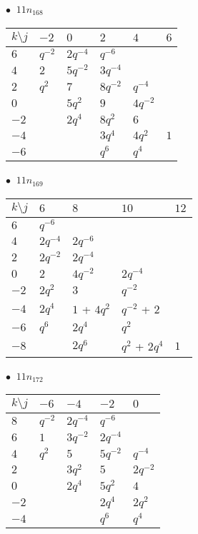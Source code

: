 \begin{minipage}{\linewidth}
$\bullet\ $ $11n_{168}$ \vspace{0.5em} \\
\begin{tabular}{l|lllll}
$k \setminus j$ & $-2$ & $0$ & $2$ & $4$ & $6$ \\
\hline
$6$ & $q^{-2}$ & $2q^{-4}$ & $q^{-6}$ &  &  \\
$4$ & $2$ & $5q^{-2}$ & $3q^{-4}$ &  &  \\
$2$ & $q^{2}$ & $7$ & $8q^{-2}$ & $q^{-4}$ &  \\
$0$ &  & $5q^{2}$ & $9$ & $4q^{-2}$ &  \\
$-2$ &  & $2q^{4}$ & $8q^{2}$ & $6$ &  \\
$-4$ &  &  & $3q^{4}$ & $4q^{2}$ & $1$ \\
$-6$ &  &  & $q^{6}$ & $q^{4}$ &  \\
\end{tabular}
\vspace{2em}
\end{minipage}
%
\begin{minipage}{\linewidth}
$\bullet\ $ $11n_{169}$ \vspace{0.5em} \\
\begin{tabular}{l|llll}
$k \setminus j$ & $6$ & $8$ & $10$ & $12$ \\
\hline
$6$ & $q^{-6}$ &  &  &  \\
$4$ & $2q^{-4}$ & $2q^{-6}$ &  &  \\
$2$ & $2q^{-2}$ & $2q^{-4}$ &  &  \\
$0$ & $2$ & $4q^{-2}$ & $2q^{-4}$ &  \\
$-2$ & $2q^{2}$ & $3$ & $q^{-2}$ &  \\
$-4$ & $2q^{4}$ & $1$ + $4q^{2}$ & $q^{-2}$ + $2$ &  \\
$-6$ & $q^{6}$ & $2q^{4}$ & $q^{2}$ &  \\
$-8$ &  & $2q^{6}$ & $q^{2}$ + $2q^{4}$ & $1$ \\
\end{tabular}
\vspace{2em}
\end{minipage}
%
\begin{minipage}{\linewidth}
$\bullet\ $ $11n_{172}$ \vspace{0.5em} \\
\begin{tabular}{l|llll}
$k \setminus j$ & $-6$ & $-4$ & $-2$ & $0$ \\
\hline
$8$ & $q^{-2}$ & $2q^{-4}$ & $q^{-6}$ &  \\
$6$ & $1$ & $3q^{-2}$ & $2q^{-4}$ &  \\
$4$ & $q^{2}$ & $5$ & $5q^{-2}$ & $q^{-4}$ \\
$2$ &  & $3q^{2}$ & $5$ & $2q^{-2}$ \\
$0$ &  & $2q^{4}$ & $5q^{2}$ & $4$ \\
$-2$ &  &  & $2q^{4}$ & $2q^{2}$ \\
$-4$ &  &  & $q^{6}$ & $q^{4}$ \\
\end{tabular}
\vspace{2em}
\end{minipage}
